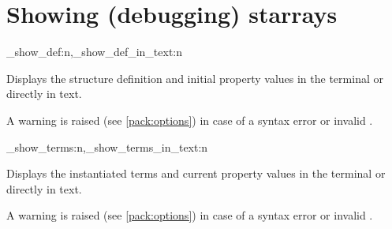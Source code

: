 \documentclass[10pt]{article}
\begin{document}
\section{Showing (debugging) starrays }\label{pack:show}

\begin{codedescribe}{\starray_show_def:n,\starray_show_def_in_text:n}
\begin{codesyntax}%
\end{codesyntax}
Displays the  structure definition and initial property values in the terminal or directly in text.
\end{codedescribe}
\begin{tsremark}
A warning is raised (see \ref{pack:options}) in case of a  syntax error or invalid .
\end{tsremark}


\begin{codedescribe}{\starray_show_terms:n,\starray_show_terms_in_text:n}
\begin{codesyntax}%
\end{codesyntax}
Displays the  instantiated terms and current  property values in the terminal or directly in text.
\end{codedescribe}
\begin{tsremark}
A warning is raised (see \ref{pack:options}) in case of a  syntax error or invalid .
\end{tsremark}

\printbibliography
\end{document}
